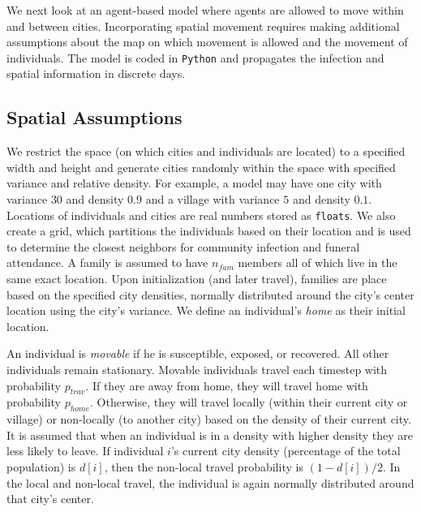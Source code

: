 
We next look at an agent-based model where agents are allowed to move within and between cities. Incorporating spatial movement requires making additional assumptions about the map on which movement is allowed and the movement of individuals. The model is coded in \texttt{Python} and propagates the infection and spatial information in discrete days. 

\subsection{Spatial Assumptions}
We restrict the space (on which cities and individuals are located) to a specified width and height and generate cities randomly within the space with specified variance and relative density. For example, a model may have one city with variance $30$ and density $0.9$ and a village with variance $5$ and density $0.1$. Locations of individuals and cities are real numbers stored as \texttt{floats}. We also create a grid, which partitions the individuals based on their location and is used to determine the closest neighbors for community infection and funeral attendance. A family is assumed to have $n_{fam}$ members all of which live in the same exact location. Upon initialization (and later travel), families are place based on the specified city densities, normally distributed around the city's center location using the city's variance. We define an individual's \emph{home} as their initial location.

An individual is \emph{movable} if he is susceptible, exposed, or recovered. All other individuals remain stationary. Movable individuals travel each timestep with probability $p_{trav}$. If they are away from home, they will travel home with probability $p_{home}$. Otherwise, they will travel locally (within their current city or village) or non-locally (to another city) based on the density of their current city. It is assumed that when an individual is in a density with higher density they are less likely to leave. If individual $i$'s current city density (percentage of the total population) is $d[i]$, then the non-local travel probability is $(1-d[i])/2$. In the local and non-local travel, the individual is again normally distributed around that city's center.

